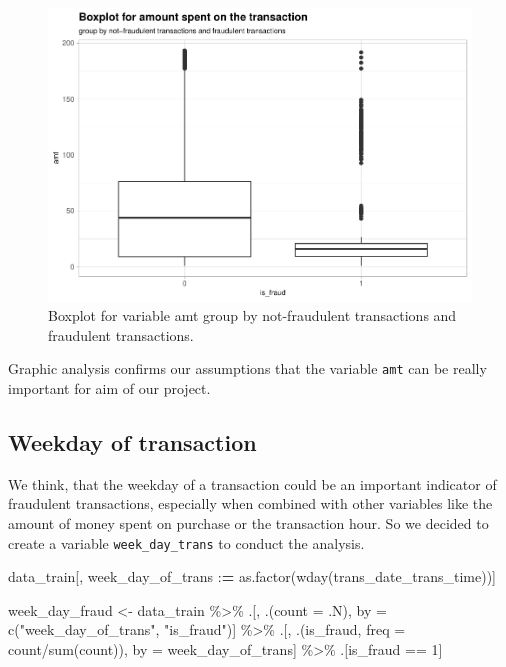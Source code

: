 \documentclass[
]{report}
\newenvironment{Shaded}{\begin{snugshade}}{\end{snugshade}}
\newcommand{\AttributeTok}[1]{\textcolor[rgb]{0.77,0.63,0.00}{#1}}
\newcommand{\DecValTok}[1]{\textcolor[rgb]{0.00,0.00,0.81}{#1}}
\newcommand{\ErrorTok}[1]{\textcolor[rgb]{0.64,0.00,0.00}{\textbf{#1}}}
\newcommand{\FunctionTok}[1]{\textcolor[rgb]{0.00,0.00,0.00}{#1}}
\newcommand{\NormalTok}[1]{#1}
\newcommand{\OtherTok}[1]{\textcolor[rgb]{0.56,0.35,0.01}{#1}}
\newcommand{\SpecialCharTok}[1]{\textcolor[rgb]{0.00,0.00,0.00}{#1}}
\newcommand{\StringTok}[1]{\textcolor[rgb]{0.31,0.60,0.02}{#1}}
\begin{document}
\begin{figure}
\centering
\includegraphics{credit_card_fraud_detection_files/figure-latex/amt_plot-1.pdf}
\caption{\label{Fig:amt_plot}Boxplot for variable amt group by
not-fraudulent transactions and fraudulent transactions.}
\end{figure}

Graphic analysis confirms our assumptions that the variable \texttt{amt}
can be really important for aim of our project.

\hypertarget{weekday-of-transaction}{%
\subsection{Weekday of transaction}\label{weekday-of-transaction}}

We think, that the weekday of a transaction could be an important
indicator of fraudulent transactions, especially when combined with
other variables like the amount of money spent on purchase or the
transaction hour. So we decided to create a variable
\texttt{week\_day\_trans} to conduct the analysis.

\begin{Shaded}
\begin{Highlighting}[]
\NormalTok{data\_train[, week\_day\_of\_trans }\SpecialCharTok{:}\ErrorTok{=} \FunctionTok{as.factor}\NormalTok{(}\FunctionTok{wday}\NormalTok{(trans\_date\_trans\_time))]}
\end{Highlighting}
\end{Shaded}

\begin{Shaded}
\begin{Highlighting}[]
\NormalTok{week\_day\_fraud }\OtherTok{\textless{}{-}}\NormalTok{ data\_train }\SpecialCharTok{\%\textgreater{}\%} 
\NormalTok{  .[, .(}\AttributeTok{count =}\NormalTok{ .N), by }\OtherTok{=} \FunctionTok{c}\NormalTok{(}\StringTok{"week\_day\_of\_trans"}\NormalTok{, }\StringTok{"is\_fraud"}\NormalTok{)] }\SpecialCharTok{\%\textgreater{}\%}
\NormalTok{  .[, .(is\_fraud, }\AttributeTok{freq =}\NormalTok{ count}\SpecialCharTok{/}\FunctionTok{sum}\NormalTok{(count)), by }\OtherTok{=}\NormalTok{ week\_day\_of\_trans] }\SpecialCharTok{\%\textgreater{}\%}
\NormalTok{  .[is\_fraud }\SpecialCharTok{==} \DecValTok{1}\NormalTok{]}
\end{Highlighting}
\end{Shaded}
\end{document}
